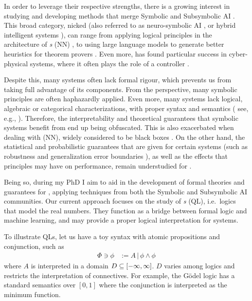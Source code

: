 In order to leverage their respective strengths, there is a growing interest in studying and developing methods that merge Symbolic and Subsymbolic AI \mcita{}. This broad category, nicked \emph{\InAI{}}  \citep{Platzer_2024} (also referred to as neuro-symbolic AI \mcita{}, or hybrid intelligent systems \mcita{}), can range from applying logical principles in the architecture of \emph{ \NN{}s} (NN)  \mcita{}, to using large language models to generate better heuristics for theorem provers \mcita{}. Even more, \InAI{} has found particular success in cyber-physical systems, where it often plays the role of a controller \citep{Platzer_2024}. 

Despite this, many \InAI{} systems often lack formal rigour, which prevents us from taking full advantage of its components. From the \SiAI{} perspective,  many symbolic principles are often haphazardly applied. Even more, many \InAI{} systems lack logical, algebraic or categorical characterizations, with proper syntax and semantics ( see, e.g., \mcita{}). Therefore, the interpretability and theoretical guarantees that symbolic systems benefit from end up being obfuscated. This is also exacerbated when dealing with \emph{\NN{}} (NN), widely considered to be black boxes \mcita{}. On the other hand, the statistical and probabilistic guarantees that are given for certain \SuAI{}  systems (such as robustness \mcita{} and generalization error boundaries \mcita{} ), as well as the effects that \SiAI{} principles may have on performance, remain understudied for \InAI{}.

Being so, during my PhD I aim to aid in the development of formal theories and guarantees for \InAI{}, applying techniques from both the Symbolic and Subsymbolic AI communities. Our current approach focuses on the study of \emph{\QL{}s} (QL), i.e.~logics that model the real numbers. They function as a bridge between formal logic and machine learning, and may provide a proper logical interpretation for \InAI{} systems.

To illustrate QLs, let us have a toy syntax with atomic propositions and conjunction, such as
\begin{equation}
\begin{split}
    \Phi \ni \phi &:= A \,|\, \phi \land \phi
\end{split}
\end{equation}
where $A$ is interpreted in a domain $D \subseteq [-\infty,\infty]$. $D$ varies among logics and restricts the interpretation of connectives. For example, the
G\"{o}del logic \mcita{} has a standard semantics over $[0, 1]$ where the conjunction is interpreted as the minimum function.

